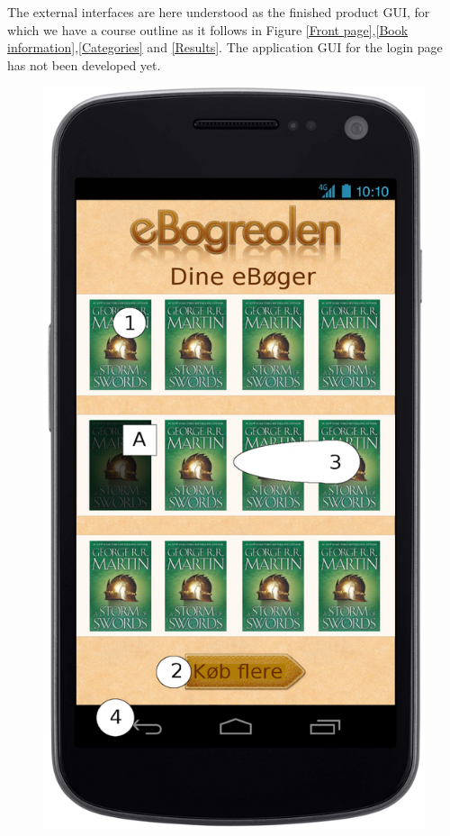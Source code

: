 \documentclass[12pt]{article}
\begin{document}
The external interfaces are here understood as the finished product GUI, for which we have a course outline as it follows in Figure \ref{Front page},\ref{Book information},\ref{Categories} and \ref{Results}. The application GUI for the login page has not been developed yet.
\begin{figure}
\includegraphics[scale=0.7]{gnexforside.png}

\end{figure}
\end{document}
